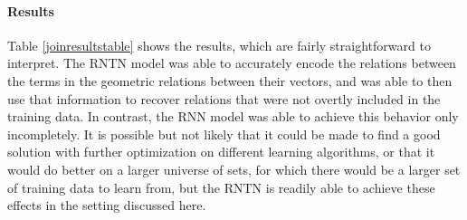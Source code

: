 
\paragraph{Results} 
Table \ref{joinresultstable} shows the results, which are fairly straightforward 
to interpret. The RNTN model
was able to accurately encode the relations between the terms in the
geometric relations between their vectors, and was able to then use
that information to recover relations that were not overtly included
in the training data. In contrast, the RNN model was able to achieve
this behavior only incompletely. It is possible but not likely that it
could be made to find a good solution with further optimization on
different learning algorithms, or that it would do better on a larger
universe of sets, for which there would be a larger set of training
data to learn from, but the RNTN is readily able to achieve these
effects in the setting discussed here.

